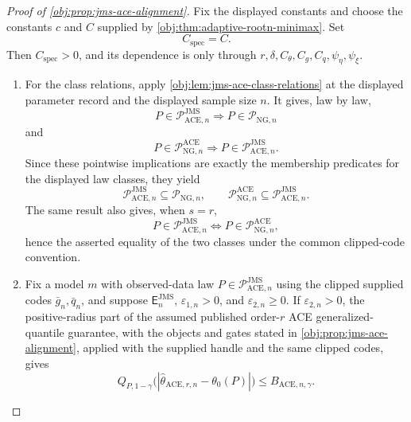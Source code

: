 \documentclass[11pt]{article}
\begin{document}
\begin{proof}[Proof of \cref{obj:prop:jms-ace-alignment}]
Fix the displayed constants and choose the constants \(c\) and \(C\) supplied by
\cref{obj:thm:adaptive-rootn-minimax}.  Set
\[
  C_{\mathrm{spec}}=C .
\]
Then \(C_{\mathrm{spec}}>0\), and its dependence is only through
\(r,\delta,C_{\theta},C_g,C_q,\psi_{\eta},\psi_{\xi}\).

\begin{enumerate}
\item For the class relations, apply \cref{obj:lem:jms-ace-class-relations} at
the displayed parameter record and the displayed sample size \(n\).  It gives,
law by law,
\[
  P\in\mathcal P_{\mathrm{ACE},n}^{\mathrm{JMS}}
  \Longrightarrow
  P\in\mathcal P_{\mathrm{NG},n}
\]
and
\[
  P\in\mathcal P_{\mathrm{NG},n}^{\mathrm{ACE}}
  \Longrightarrow
  P\in\mathcal P_{\mathrm{ACE},n}^{\mathrm{JMS}} .
\]
Since these pointwise implications are exactly the membership predicates for
the displayed law classes, they yield
\[
 \mathcal P_{\mathrm{ACE},n}^{\mathrm{JMS}}
 \subseteq \mathcal P_{\mathrm{NG},n},
 \qquad
 \mathcal P_{\mathrm{NG},n}^{\mathrm{ACE}}
 \subseteq \mathcal P_{\mathrm{ACE},n}^{\mathrm{JMS}} .
\]
The same result also gives, when \(s=r\),
\[
  P\in\mathcal P_{\mathrm{ACE},n}^{\mathrm{JMS}}
  \Longleftrightarrow
  P\in\mathcal P_{\mathrm{NG},n}^{\mathrm{ACE}},
\]
hence the asserted equality of the two classes under the common clipped-code
convention.

\item Fix a model \(m\) with observed-data law
\(P\in\mathcal P_{\mathrm{ACE},n}^{\mathrm{JMS}}\) using the clipped supplied
codes \(\bar g_n,\bar q_n\), and suppose \(\mathsf E_n^{\mathrm{JMS}}\),
\(\varepsilon_{1,n}>0\), and \(\varepsilon_{2,n}\ge0\).  If
\(\varepsilon_{2,n}>0\), the positive-radius part of the assumed published
order-\(r\) ACE generalized-quantile guarantee, with the objects and gates
stated in \cref{obj:prop:jms-ace-alignment}, applied with the supplied handle
and the same clipped codes, gives
\[
 Q_{P,1-\gamma}
 \bigl(|\widehat\theta_{\mathrm{ACE},r,n}-\theta_0(P)|\bigr)
 \le B_{\mathrm{ACE},n,\gamma}.
\]


\end{enumerate}
\end{proof}
\end{document}

